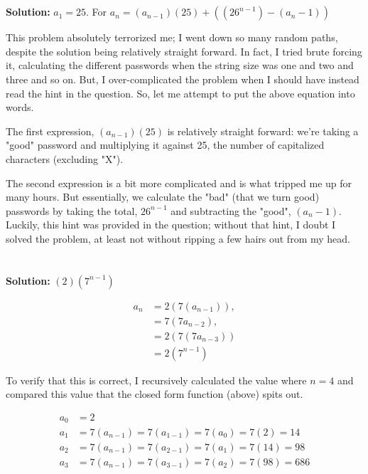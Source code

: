 \documentclass{article}
\begin{document}
\section{}

\textbf{Solution: } 
$a_1 = 25$. For $a_n = (a_{n-1})(25) + ((26^{n-1}) - (a_n - 1))$

This problem absolutely terrorized me; I went down so many random paths, despite the solution being relatively straight forward. In fact, I tried brute forcing it, calculating the different passwords when the string size was one and two and three and so on. But, I over-complicated the problem when I should have instead read the hint in the question. So, let me attempt to put the above equation into words. 

The first expression, $(a_{n-1})(25)$ is relatively straight forward: we're taking a "good" password and multiplying it against 25, the number of capitalized characters (excluding "X").

The second expression is a bit more complicated and is what tripped me up for many hours. But essentially, we calculate the "bad" (that we turn good) passwords by taking the total, $26^{n-1}$ and subtracting the "good", $(a_n - 1)$. Luckily, this hint was provided in the question; without that hint, I doubt I solved the problem, at least not without ripping a few hairs out from my head.


\newpage


\section{}

\textbf{Solution: } $(2)(7^{n-1})$

\begin{align*}
a_n &= 2(7(a_{n-1})), \\
    &= 7(7a_{n-2}), \\
    &= 2(7(7a_{n-3})) \\
    &= 2(7^{n-1})
\end{align*}

To verify that this is correct, I recursively calculated the value where $n=4$ and compared this value that the closed form function (above) spits out.

\begin{align*}
a_0 &= 2 \\
a_1 &= 7(a_{n-1}) = 7(a_{1-1}) = 7(a_{0}) = 7(2) = 14 \\
a_2 &= 7(a_{n-1}) = 7(a_{2-1}) = 7(a_{1}) = 7(14) = 98 \\
a_3 &= 7(a_{n-1}) = 7(a_{3-1}) = 7(a_{2}) = 7(98) = 686 \\
\end{align*}
\end{document}
